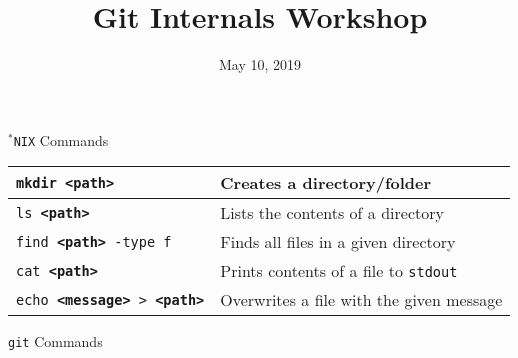 \documentclass[a4paper]{article}
\title{Git Internals Workshop}
\date{May 10, 2019}
\begin{document}
\maketitle

{\Large \texttt{$^*$NIX} Commands}

\begin{tabular}{ l l }
  \texttt{mkdir \textbf{<path>}} & Creates a directory/folder \\
  \hline
  \texttt{ls \textbf{<path>}} & Lists the contents of a directory \\
  \hline
  \texttt{find \textbf{<path>} -type f} & Finds all files in a given directory \\
  \hline
  \texttt{cat \textbf{<path>}} & Prints contents of a file to \texttt{stdout} \\
  \hline
  \texttt{echo \textbf{<message>} > \textbf{<path>}} &
    Overwrites a file with the given message \\
  \hline
\end{tabular}

\vspace{0.2in}

{\Large \texttt{git} Commands}
\end{document}

